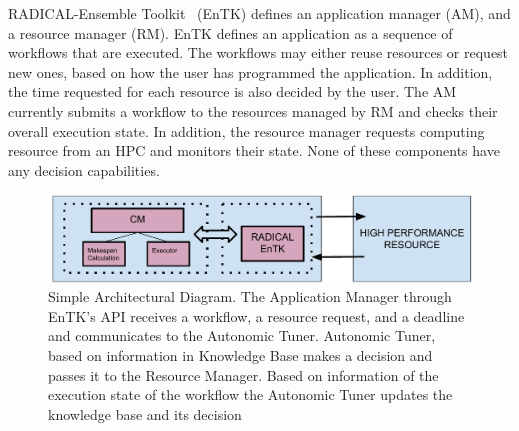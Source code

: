 RADICAL-Ensemble Toolkit~\cite{balasubramanian2018harnessing} (EnTK) defines 
an application manager (AM), and a resource manager (RM). EnTK defines an 
application as a sequence of workflows that are executed. The workflows may 
either reuse resources or request new ones, based on how the user has 
programmed the application. In addition, the time requested for each resource 
is also decided by the user. The AM currently submits a workflow to the 
resources managed by RM and checks their overall execution state. In addition,
 the resource manager requests computing resource from an HPC and monitors 
their state. None of these components have any decision capabilities.

\begin{figure}[t]
    \centering
    \includegraphics[width=.95\textwidth]{figures/CEM_RefArch.pdf}
    \caption{Simple Architectural Diagram. The Application Manager through 
    EnTK's API receives a workflow, a resource request, and a deadline and 
    communicates to the Autonomic Tuner. Autonomic Tuner, based on 
    information in Knowledge Base makes a decision and passes it to the 
    Resource Manager. Based on information of the execution state of the 
    workflow the Autonomic Tuner updates the knowledge base and its decision}\label{fig:architecture}
\end{figure}



